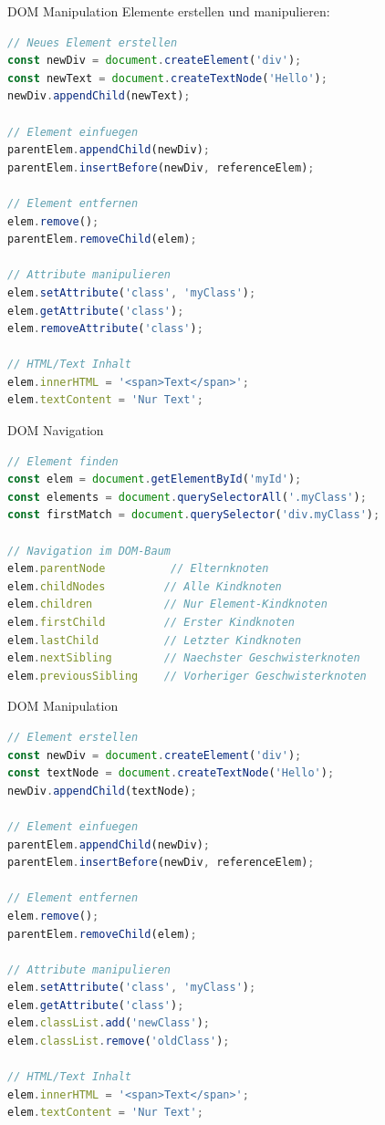 \begin{KR}{DOM Manipulation}
Elemente erstellen und manipulieren:
\begin{lstlisting}[language=JavaScript, style=basesmol]
// Neues Element erstellen
const newDiv = document.createElement('div');
const newText = document.createTextNode('Hello');
newDiv.appendChild(newText);

// Element einfuegen
parentElem.appendChild(newDiv);
parentElem.insertBefore(newDiv, referenceElem);

// Element entfernen
elem.remove();
parentElem.removeChild(elem);

// Attribute manipulieren
elem.setAttribute('class', 'myClass');
elem.getAttribute('class');
elem.removeAttribute('class');

// HTML/Text Inhalt
elem.innerHTML = '<span>Text</span>';
elem.textContent = 'Nur Text';
\end{lstlisting}
\end{KR}

\begin{KR}{DOM Navigation}
\begin{lstlisting}[language=JavaScript, style=basesmol]
// Element finden
const elem = document.getElementById('myId');
const elements = document.querySelectorAll('.myClass');
const firstMatch = document.querySelector('div.myClass');

// Navigation im DOM-Baum
elem.parentNode          // Elternknoten
elem.childNodes         // Alle Kindknoten
elem.children           // Nur Element-Kindknoten
elem.firstChild         // Erster Kindknoten
elem.lastChild          // Letzter Kindknoten
elem.nextSibling        // Naechster Geschwisterknoten
elem.previousSibling    // Vorheriger Geschwisterknoten
\end{lstlisting}
\end{KR}

\begin{KR}{DOM Manipulation}
\begin{lstlisting}[language=JavaScript, style=basesmol]
// Element erstellen
const newDiv = document.createElement('div');
const textNode = document.createTextNode('Hello');
newDiv.appendChild(textNode);

// Element einfuegen
parentElem.appendChild(newDiv);
parentElem.insertBefore(newDiv, referenceElem);

// Element entfernen
elem.remove();
parentElem.removeChild(elem);

// Attribute manipulieren
elem.setAttribute('class', 'myClass');
elem.getAttribute('class');
elem.classList.add('newClass');
elem.classList.remove('oldClass');

// HTML/Text Inhalt
elem.innerHTML = '<span>Text</span>';
elem.textContent = 'Nur Text';
\end{lstlisting}
\end{KR}

